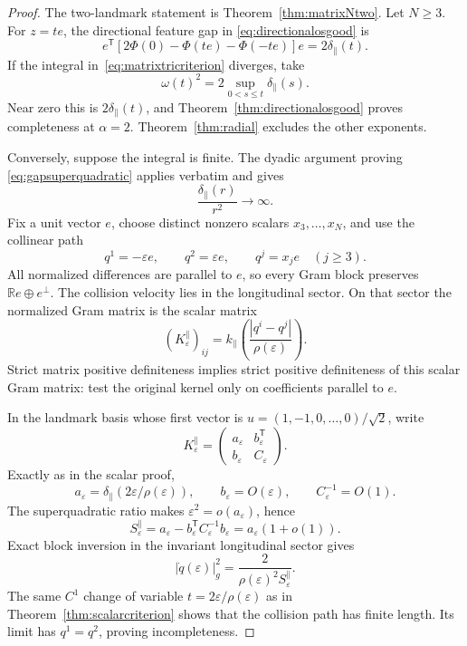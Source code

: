 \documentclass[11pt]{article}
\newcommand{\R}{\mathbb{R}}
\begin{document}
\begin{proof}
The two-landmark statement is Theorem~\ref{thm:matrixNtwo}.  Let \(N\ge3\).
For \(z=te\), the directional feature gap in
\eqref{eq:directionalosgood} is
\[
 e^{\mathsf T}[2\Phi(0)-\Phi(te)-\Phi(-te)]e
 =2\delta_\parallel(t).
\]
If the integral in~\eqref{eq:matrixtricriterion} diverges, take
\[
 \omega(t)^2=2\sup_{0<s\le t}\delta_\parallel(s).
\]
Near zero this is \(2\delta_\parallel(t)\), and
Theorem~\ref{thm:directionalosgood} proves completeness at \(\alpha=2\).
Theorem~\ref{thm:radial} excludes the other exponents.

Conversely, suppose the integral is finite.  The dyadic argument proving
\eqref{eq:gapsuperquadratic} applies verbatim and gives
\[
 \frac{\delta_\parallel(r)}{r^2}\longrightarrow\infty.
\]
Fix a unit vector \(e\), choose distinct nonzero scalars
\(x_3,\ldots,x_N\), and use the collinear path
\[
 q^1=-\varepsilon e,\qquad q^2=\varepsilon e,\qquad
 q^j=x_j e\quad(j\ge3).
\]
All normalized differences are parallel to \(e\), so every Gram block
preserves
\(\R e\oplus e^\perp\).  The collision velocity lies in the longitudinal
sector.  On that sector the normalized Gram matrix is the scalar matrix
\[
 (K_\varepsilon^\parallel)_{ij}
 =k_\parallel\left(
   \frac{|q^i-q^j|}{\rho(\varepsilon)}
  \right).
\]
Strict matrix positive definiteness implies strict positive definiteness of
this scalar Gram matrix: test the original kernel only on coefficients
parallel to \(e\).

In the landmark basis whose first vector is
\(u=(1,-1,0,\ldots,0)/\sqrt2\), write
\[
 K_\varepsilon^\parallel=
 \begin{pmatrix}
  a_\varepsilon&b_\varepsilon^{\mathsf T}\\
  b_\varepsilon&C_\varepsilon
 \end{pmatrix}.
\]
Exactly as in the scalar proof,
\[
 a_\varepsilon
 =\delta_\parallel(2\varepsilon/\rho(\varepsilon)),\qquad
 b_\varepsilon=O(\varepsilon),\qquad
 C_\varepsilon^{-1}=O(1).
\]
The superquadratic ratio makes
\(\varepsilon^2=o(a_\varepsilon)\), hence
\[
 S_\varepsilon^\parallel
 =a_\varepsilon-
 b_\varepsilon^{\mathsf T}C_\varepsilon^{-1}b_\varepsilon
 =a_\varepsilon(1+o(1)).
\]
Exact block inversion in the invariant longitudinal sector gives
\[
 |\dot q(\varepsilon)|_g^2
 =\frac{2}{
 \rho(\varepsilon)^2S_\varepsilon^\parallel}.
\]
The same \(C^1\) change of variable
\(t=2\varepsilon/\rho(\varepsilon)\) as in
Theorem~\ref{thm:scalarcriterion} shows that the collision path has finite
length.  Its limit has \(q^1=q^2\), proving incompleteness.
\end{proof}
\end{document}
